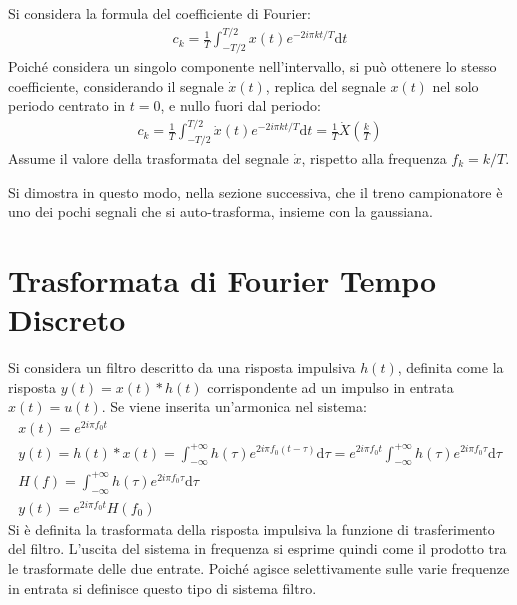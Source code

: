 \documentclass{article}
\newcommand{\df}{\mathrm{d}}
\numberwithin{equation}{subsection}
\begin{document}
Si considera la formula del coefficiente di Fourier:
\begin{gather*}
    c_k=\frac{1}{T}\displaystyle\int_{-T/2}^{T/2}x(t)e^{-2i\pi kt/T}\df t
\end{gather*}
Poiché considera un singolo componente nell'intervallo, si può ottenere lo stesso coefficiente, considerando il segnale $\dot x(t)$, replica del segnale $x(t)$ nel solo periodo 
centrato in $t=0$, e nullo fuori dal periodo:
\begin{gather*}
    c_k=\frac{1}{T}\displaystyle\int_{-T/2}^{T/2}\dot x(t)e^{-2i\pi kt/T}\df t=\frac{1}{T}\dot X\left(\frac{k}{T}\right)
\end{gather*}
Assume il valore della trasformata del segnale $\dot x$, rispetto alla frequenza $f_k=k/T$. 

Si dimostra in questo modo, nella sezione successiva, che il treno campionatore è uno dei pochi segnali che si auto-trasforma, insieme con la gaussiana. 

\clearpage

\section{Trasformata di Fourier Tempo Discreto}

Si considera un filtro descritto da una risposta impulsiva $h(t)$, definita come la risposta $y(t)=x(t)*h(t)$ corrispondente ad un impulso in entrata $x(t)=u(t)$. Se viene 
inserita un'armonica nel sistema:
\begin{gather*}
    x(t)=e^{2i\pi f_0t}\\
    y(t)=h(t)*x(t)=\displaystyle\int_{-\infty}^{+\infty}h(\tau)e^{2i\pi f_0(t-\tau)}\df\tau=e^{2i\pi f_0t}\int_{-\infty}^{+\infty}h(\tau)e^{2i\pi f_0\tau}\df\tau\\
    H(f)=\displaystyle\int_{-\infty}^{+\infty}h(\tau)e^{2i\pi f_0\tau}\df\tau\\
    y(t)=e^{2i\pi f_0t}H(f_0)
\end{gather*}
Si è definita la trasformata della risposta impulsiva la funzione di trasferimento del filtro. L'uscita del sistema in frequenza si esprime quindi come il prodotto 
tra le trasformate delle due entrate. Poiché agisce selettivamente sulle varie frequenze in entrata si definisce questo tipo di sistema filtro. 
\end{document}
